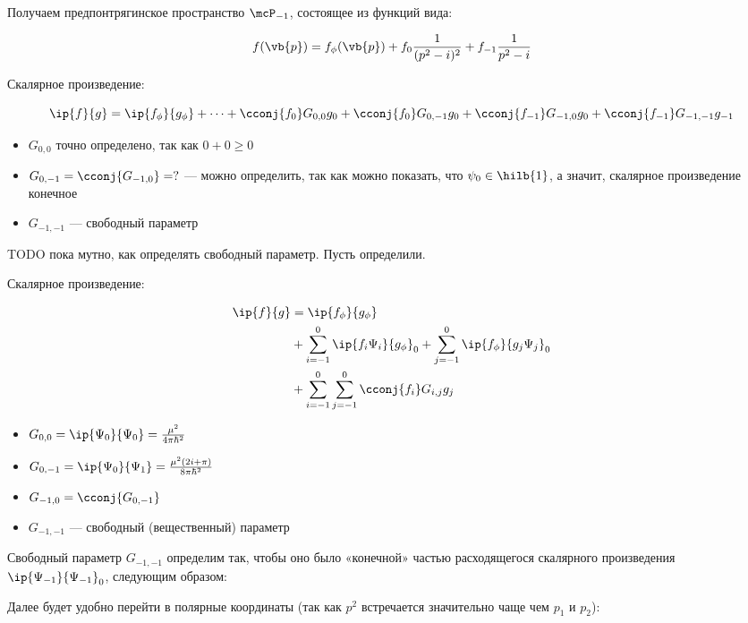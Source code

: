 Получаем предпонтрягинское пространство $\mcP_{-1}$, состоящее из функций вида:

\[
f(\vb{p}) = f_\phi(\vb{p}) + f_0 \frac{1}{(p^2 - i)^2} + f_{-1} \frac{1}{p^2 - i}
\]

Скалярное произведение:

\[
\ip{f}{g} = \ip{f_\phi}{g_\phi} + \dots + \cconj{f_0} G_{0,0} g_0 + \cconj{f_0} G_{0, -1} g_0 + \cconj{f_{-1}} G_{-1, 0} g_0 + \cconj{f_{-1}} G_{-1, -1} g_{-1}
\]

\begin{itemize}
\item $G_{0, 0}$ точно определено, так как $0 + 0 \ge 0$
\item $G_{0, -1} = \cconj{G_{-1, 0}} = ?$ — можно определить, так как можно показать, что $\psi_0 \in \hilb{1}$, а значит, скалярное произведение конечное
\item $G_{-1, -1}$ — свободный параметр
\end{itemize}

TODO пока мутно, как определять свободный параметр. Пусть определили.


Скалярное произведение:

\begin{align*}
\ip{f}{g}
&= \ip{f_\phi}{g_\phi} \\
&+ \sum\limits_{i = -1}^0 \ip{f_i \Psi_i}{g_\phi}_0 + \sum\limits_{j = -1}^0 \ip{f_\phi}{g_j \Psi_j}_0 \\
&+ \sum\limits_{i = -1}^0 \sum \limits_{j = -1}^0 \cconj{f_i} G_{i,j} g_j 
\end{align*}

\begin{itemize}
\item $G_{0, 0} = \ip{\Psi_0}{\Psi_0} = \frac{\mu^2}{4 \pi \hbar^2}$
\item $G_{0, -1} = \ip{\Psi_0}{\Psi_1} = \frac{\mu^2 (2 i + \pi)}{8 \pi \hbar^2}$
\item $G_{-1, 0} = \cconj{G_{0, -1}}$
\item $G_{-1, -1}$ — свободный (вещественный) параметр
\end{itemize}

Свободный параметр $G_{-1, -1}$ определим так, чтобы оно было «конечной» частью расходящегося скалярного произведения $\ip{\Psi_{-1}}{\Psi_{-1}}_0$, следующим образом:

Далее будет удобно перейти в полярные координаты (так как $p^2$ встречается значительно чаще чем $p_1$ и $p_2$):

